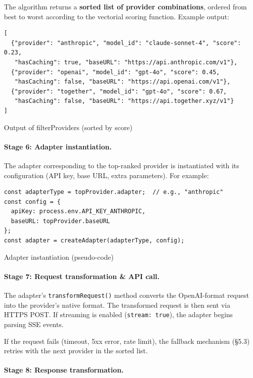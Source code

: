 \documentclass[english]{article}
\begin{document}
The algorithm returns a \textbf{sorted list of provider combinations}, ordered from best to worst according to the vectorial scoring function. Example output:
\begin{listing}[H]
\begin{verbatim}
[
  {"provider": "anthropic", "model_id": "claude-sonnet-4", "score": 0.23,
   "hasCaching": true, "baseURL": "https://api.anthropic.com/v1"},
  {"provider": "openai", "model_id": "gpt-4o", "score": 0.45,
   "hasCaching": false, "baseURL": "https://api.openai.com/v1"},
  {"provider": "together", "model_id": "gpt-4o", "score": 0.67,
   "hasCaching": false, "baseURL": "https://api.together.xyz/v1"}
]
\end{verbatim}
\caption{Output of filterProviders (sorted by score)}
\end{listing}

\paragraph{Stage 6: Adapter instantiation.}

The adapter corresponding to the top-ranked provider is instantiated with its configuration (API key, base URL, extra parameters). For example:
\begin{listing}[H]
\begin{verbatim}
const adapterType = topProvider.adapter;  // e.g., "anthropic"
const config = {
  apiKey: process.env.API_KEY_ANTHROPIC,
  baseURL: topProvider.baseURL
};
const adapter = createAdapter(adapterType, config);
\end{verbatim}
\caption{Adapter instantiation (pseudo-code)}
\end{listing}

\paragraph{Stage 7: Request transformation \& API call.}

The adapter's \texttt{transformRequest()} method converts the OpenAI-format request into the provider's native format. The transformed request is then sent via HTTPS POST. If streaming is enabled (\texttt{stream: true}), the adapter begins parsing SSE events.

If the request fails (timeout, 5xx error, rate limit), the fallback mechanism (§5.3) retries with the next provider in the sorted list.

\paragraph{Stage 8: Response transformation.}
\end{document}
